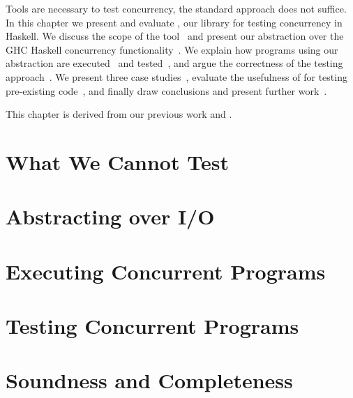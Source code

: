 Tools are necessary to test concurrency, the standard approach does not suffice.
In this chapter we present and evaluate \dejafu{}, our library for testing
concurrency in Haskell.  We discuss the scope of the tool~
and present our abstraction over the GHC Haskell concurrency
functionality~.  We explain how programs using our
abstraction are executed~ and
tested~, and argue the correctness of the testing
approach~.  We present three case
studies~, evaluate the usefulness of \dejafu{} for
testing pre-existing code~, and finally draw conclusions
and present further work~.

This chapter is derived from our previous work \cite{walker2015} and
\cite{YCS-2016-503}.


\section{What We Cannot Test}
\label{sec:dejafu-scope}

\blindtext

\section{Abstracting over I/O}
\label{sec:dejafu-monadconc}

\blindtext

\section{Executing Concurrent Programs}
\label{sec:dejafu-execution}

\blindtext

\section{Testing Concurrent Programs}
\label{sec:dejafu-testing}

\blindtext

\section{Soundness and Completeness}
\label{sec:dejafu-correctness}

